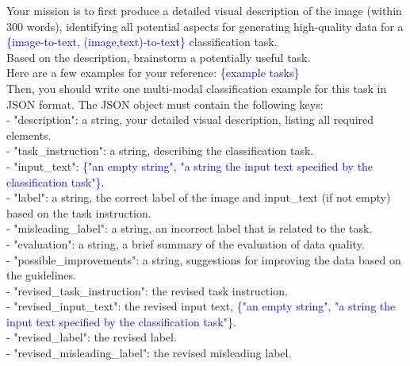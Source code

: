 \begin{figure*}[p]
\centering
\begin{prompt}[title={Prompt: Synthesizing Classification Data}, label=prompt:cla]

Your mission is to first produce a detailed visual description of the image (within 300 words), identifying all potential aspects for generating high-quality data for a \textcolor{blue}{\{image-to-text, (image,text)-to-text\}} classification task. \\
    
Based on the description, brainstorm a potentially useful task. \\

Here are a few examples for your reference:
\textcolor{blue}{\{example tasks\}} \\

Then, you should write one multi-modal classification example for this task in JSON format. The JSON object must contain the following keys: \\

- "description": a string, your detailed visual description, listing all required elements. \\
- "task\_instruction": a string, describing the classification task. \\
- "input\_text": \textcolor{blue}{\{"an empty string", "a string the input text specified by the classification task"\}}. \\
- "label": a string, the correct label of the image and input\_text (if not empty) based on the task instruction. \\
- "misleading\_label": a string, an incorrect label that is related to the task. \\
- "evaluation": a string, a brief summary of the evaluation of data quality. \\
- "possible\_improvements": a string, suggestions for improving the data based on the guidelines. \\
- "revised\_task\_instruction": the revised task instruction. \\
- "revised\_input\_text": the revised input text, \textcolor{blue}{\{"an empty string", "a string the input text specified by the classification task"\}}. \\
- "revised\_label": the revised label. \\
- "revised\_misleading\_label": the revised misleading label. \\


\end{prompt}
\end{figure*}
